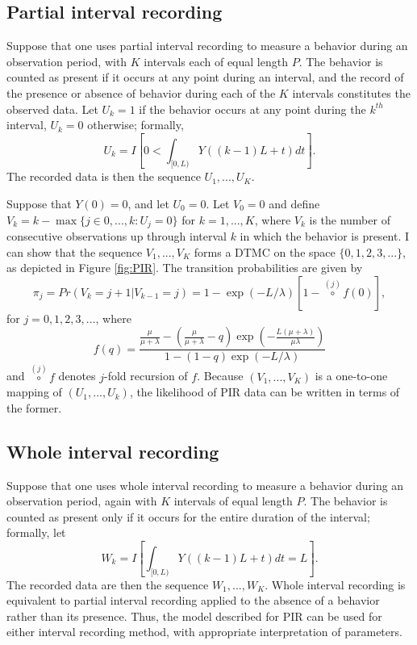 \documentclass[11pt]{article}
\begin{document}
\subsection{Partial interval recording}
\label{sec:PIR}

Suppose that one uses partial interval recording to measure a behavior during an observation period, with $K$ intervals each of equal length $P$. The behavior is counted as present if it occurs at any point during an interval, and the record of the presence or absence of behavior during each of the $K$ intervals constitutes the observed data. Let $U_k = 1$ if the behavior occurs at any point during the $k^{th}$ interval, $U_k = 0$ otherwise; formally, \[
U_k = I \left[0 < \int_{[0,L)} Y\left((k-1)L + t\right) dt\right]. \]
The recorded data is then the sequence $U_1,...,U_K$. 

Suppose that $Y(0) = 0$, and let $U_0 = 0$. Let $V_0 = 0$ and define $V_k = k - \max \{j \in 0,...,k: U_j = 0\}$ for $k=1,...,K$, where $V_k$ is the number of consecutive observations up through interval $k$ in which the behavior is present. I can show that the sequence $V_1,...,V_K$ forms a DTMC on the space $\{0,1,2,3,...\}$, as depicted in Figure \ref{fig:PIR}. The transition probabilities are given by \[
\pi_j = Pr(V_k = j + 1 |V_{k-1} = j) = 1 - \exp(- L / \lambda) \left[1 - \stackrel{(j)}{\circ}f \left(0 \right) \right], \]
for $j = 0,1,2,3,...$, where \[
f(q) = \frac{\frac{\mu}{\mu + \lambda} - \left(\frac{\mu}{\mu + \lambda} - q \right) \exp \left(-\frac{L(\mu + \lambda)}{\mu \lambda} \right)}{1 - (1 - q) \exp(-L / \lambda)} \]
and $\stackrel{(j)}{\circ}f$ denotes $j$-fold recursion of $f$. Because $(V_1,...,V_K)$ is a one-to-one mapping of $(U_1,...,U_k)$, the likelihood of PIR data can be written in terms of the former. 

\subsection{Whole interval recording}
\label{sec:WIR}

Suppose that one uses whole interval recording to measure a behavior during an observation period, again with $K$ intervals of equal length $P$. The behavior is counted as present only if it occurs for the entire duration of the interval; formally, let \[
W_k = I \left[\int_{[0,L)} Y\left((k-1)L + t\right) dt = L \right]. \]
The recorded data are then the sequence $W_1,...,W_K$. Whole interval recording is equivalent to partial interval recording applied to the absence of a behavior rather than its presence. Thus, the model described for PIR can be used for either interval recording method, with appropriate interpretation of parameters. 
\end{document}
